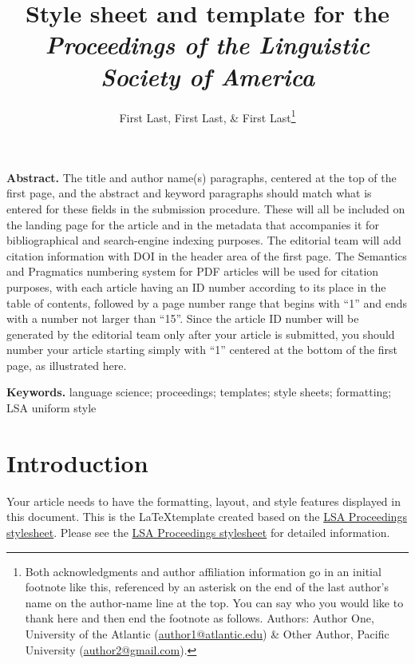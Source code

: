 \documentclass[12pt,letterpaper]{article}
\title{Style sheet and template for the \textit{Proceedings of the Linguistic Society of America}}
\author{First Last, First Last, \& First Last\footnote{Both acknowledgments and author affiliation information go in an initial footnote like this, referenced by an asterisk on the end of the last author's name on the author-name line at the top. You can say who you would like to thank here and then end the footnote as follows. Authors: Author One, University of the Atlantic (\href{mailto:author1@atlantic.edu}{author1@atlantic.edu}) \& Other Author, Pacific University (\href{mailto:author2@gmail.com}{author2@gmail.com}).}}
\renewenvironment{abstract}{%
\noindent\begin{minipage}{1\textwidth}
\setlength{\leftskip}{0.4in}
\setlength{\rightskip}{0.4in}
\textbf{Abstract.}}
{\end{minipage}}
\newenvironment{keywords}{%
\vspace{.5em}
\noindent\begin{minipage}{1\textwidth}
\setlength{\leftskip}{0.4in}
\setlength{\rightskip}{0.4in}
\textbf{Keywords.}}
{\end{minipage}}
\begin{document}
 

\setlength{\Extopsep}{6pt}
\setlength{\Exlabelsep}{9pt}		%
 
\maketitle

\begin{abstract}
The title and author name(s) paragraphs, centered at the top of the first page, and the abstract and keyword paragraphs should match what is entered for these fields in the submission procedure. These will all be included on the landing page for the article and in the metadata that accompanies it for bibliographical and search-engine indexing purposes. The editorial team will add citation information with DOI in the header area of the first page. The Semantics and Pragmatics numbering system for PDF articles will be used for citation purposes, with each article having an ID number according to its place in the table of contents, followed by a page number range that begins with ``1'' and ends with a number not larger than ``15''. Since the article ID number will be generated by the editorial team only after your article is submitted, you should number your article starting simply with ``1'' centered at the bottom of the first page, as illustrated here.
\end{abstract}

\begin{keywords} %
language science; proceedings; templates; style sheets; formatting; LSA uniform style
\end{keywords}



\section{Introduction} %
Your article needs to have the formatting, layout, and style features displayed in this document. This is the \LaTeX template created based on the \href{http://journals.linguisticsociety.org/proceedings/index.php/PLSA/pages/view/instructions}{LSA Proceedings stylesheet}. Please see the \href{http://journals.linguisticsociety.org/proceedings/index.php/PLSA/pages/view/instructions}{LSA Proceedings stylesheet} for detailed information. 
\end{document}
